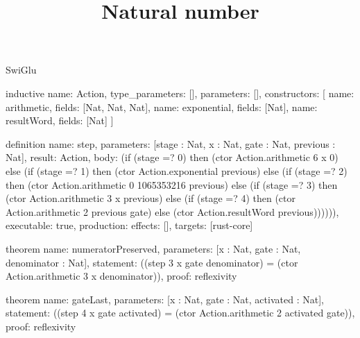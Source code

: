 \begin{lexlean}{SwiGlu}
\title{Natural number}
\begin{semanticmodule}
inductive{
  name: Action,
  type_parameters: [],
  parameters: [],
  constructors: [
    {name: arithmetic, fields: [Nat, Nat, Nat]},
    {name: exponential, fields: [Nat]},
    {name: resultWord, fields: [Nat]}
  ]
}

definition{
  name: step,
  parameters: [stage : Nat, x : Nat, gate : Nat, previous : Nat],
  result: Action,
  body: (if (stage =? 0) then (ctor Action.arithmetic 6 x 0) else (if (stage =? 1) then (ctor Action.exponential previous) else (if (stage =? 2) then (ctor Action.arithmetic 0 1065353216 previous) else (if (stage =? 3) then (ctor Action.arithmetic 3 x previous) else (if (stage =? 4) then (ctor Action.arithmetic 2 previous gate) else (ctor Action.resultWord previous)))))),
  executable: true,
  production: {effects: [], targets: [rust-core]}
}

theorem{
  name: numeratorPreserved,
  parameters: [x : Nat, gate : Nat, denominator : Nat],
  statement: ((step 3 x gate denominator) = (ctor Action.arithmetic 3 x denominator)),
  proof: reflexivity{}
}

theorem{
  name: gateLast,
  parameters: [x : Nat, gate : Nat, activated : Nat],
  statement: ((step 4 x gate activated) = (ctor Action.arithmetic 2 activated gate)),
  proof: reflexivity{}
}
\end{semanticmodule}
\end{lexlean}
